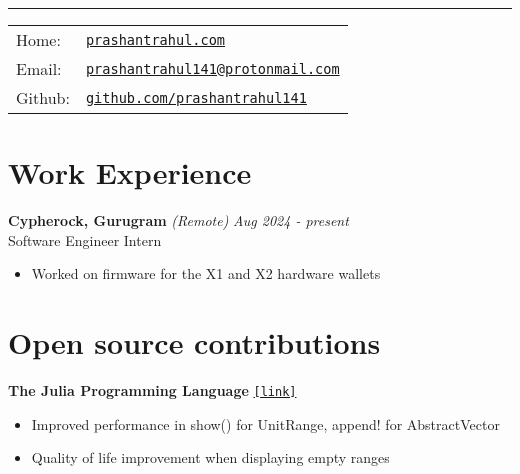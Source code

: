 \documentclass[a4paper,11pt]{article}
\begin{document}
 \vspace{0.5em}

\hrule\vspace{1em}

\noindent
\begin{tabular}{@{}l l}
Home: & \href{https://prashantrahul.com}{\texttt{prashantrahul.com}} \\
Email: & \href{mailto:prashantrahul141@protonmail.com}{\texttt{prashantrahul141@protonmail.com}} \\
Github: & \href{https://github.com/prashantrahul141}{\texttt{github.com/prashantrahul141}} \\
\end{tabular}

\section*{Work Experience}

\noindent\textbf{Cypherock, Gurugram} \textit{(Remote)} \hfill \textit{Aug 2024 - present}\\
\noindent Software Engineer Intern
\begin{itemize}[noitemsep, topsep=0pt]
    \item Worked on firmware for the X1 and X2 hardware wallets
\end{itemize}


\section*{Open source contributions}

\noindent\textbf{The Julia Programming Language} \hfill \href{https://github.com/JuliaLang/julia/issues?q=author%3Aprashantrahul141}{\texttt{[link]}}
\begin{itemize}[noitemsep, topsep=0pt]
    \item Improved performance in show() for UnitRange, append! for AbstractVector
    \item Quality of life improvement when displaying empty ranges \vspace{0.5em}
\end{itemize}

\end{document}
